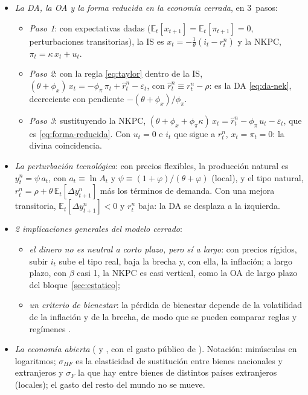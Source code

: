 \documentclass[11pt]{article}
\begin{document}
\begin{itemize}
\item \emph{La DA, la OA y la forma reducida en la economía cerrada}, en 3~pasos:
  \begin{itemize}
  \item \emph{Paso 1}: con expectativas dadas ($\mathbb{E}_t[x_{t+1}]=\mathbb{E}_t[\pi_{t+1}]=0$, perturbaciones transitorias), la IS es $x_t=-\frac{1}{\theta}(i_t-r^n_t)$ y la NKPC, $\pi_t=\kappa\,x_t+u_t$.
  \item \emph{Paso 2}: con la regla \eqref{eq:taylor} dentro de la IS, $(\theta+\phi_x)\,x_t=-\phi_{\pi}\,\pi_t+\hat r^n_t-\varepsilon_t$, con $\hat r^n_t\equiv r^n_t-\rho$: es la DA \eqref{eq:da-nek}, decreciente con pendiente $-(\theta+\phi_x)/\phi_{\pi}$.
  \item \emph{Paso 3}: sustituyendo la NKPC, $(\theta+\phi_x+\phi_{\pi}\kappa)\,x_t=\hat r^n_t-\phi_{\pi}\,u_t-\varepsilon_t$, que es \eqref{eq:forma-reducida}. Con $u_t=0$ e $i_t$ que sigue a $r^n_t$, $x_t=\pi_t=0$: la divina coincidencia.
  \end{itemize}
\item \emph{La perturbación tecnológica}: con precios flexibles, la producción natural es $y^n_t=\psi\,a_t$, con $a_t\equiv\ln A_t$ y $\psi\equiv(1+\varphi)/(\theta+\varphi)$ (local), y el tipo natural, $r^n_t=\rho+\theta\,\mathbb{E}_t[\Delta y^n_{t+1}]$ más los términos de demanda. Con una mejora transitoria, $\mathbb{E}_t[\Delta y^n_{t+1}]<0$ y $r^n_t$ baja: la DA se desplaza a la izquierda.
\item \emph{2 implicaciones generales del modelo cerrado}:
  \begin{itemize}
  \item \emph{el dinero no es neutral a corto plazo, pero sí a largo}: con precios rígidos, subir $i_t$ sube el tipo real, baja la brecha y, con ella, la inflación; a largo plazo, con $\beta$ casi 1, la NKPC es casi vertical, como la OA de largo plazo del bloque~\ref{sec:estatico};
  \item \emph{un criterio de bienestar}: la pérdida de bienestar depende de la volatilidad de la inflación y de la brecha, de modo que se pueden comparar reglas y regímenes .
  \end{itemize}
\item \emph{La economía abierta} ( y , con el gasto público de ). Notación: minúsculas en logaritmos; $\sigma_{HF}$ es la elasticidad de sustitución entre bienes nacionales y extranjeros y $\sigma_F$ la que hay entre bienes de distintos países extranjeros (locales); el gasto del resto del mundo no se mueve.

\end{itemize}
\end{document}
